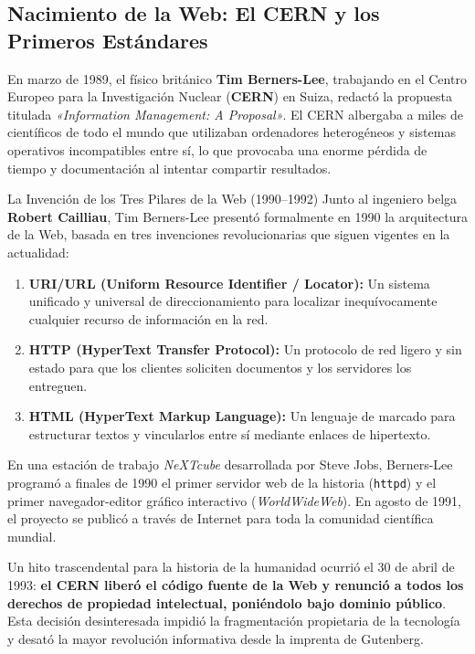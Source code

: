 \subsection{Nacimiento de la Web: El CERN y los Primeros Estándares}

En marzo de 1989, el físico británico \textbf{Tim Berners-Lee}, trabajando en el Centro Europeo para la Investigación Nuclear (\textbf{CERN}) en Suiza, redactó la propuesta titulada \textit{«Information Management: A Proposal»}. El CERN albergaba a miles de científicos de todo el mundo que utilizaban ordenadores heterogéneos y sistemas operativos incompatibles entre sí, lo que provocaba una enorme pérdida de tiempo y documentación al intentar compartir resultados.

\begin{historia}{La Invención de los Tres Pilares de la Web (1990--1992)}
Junto al ingeniero belga \textbf{Robert Cailliau}, Tim Berners-Lee presentó formalmente en 1990 la arquitectura de la Web, basada en tres invenciones revolucionarias que siguen vigentes en la actualidad:
\begin{enumerate}
  \item \textbf{URI/URL (Uniform Resource Identifier / Locator):} Un sistema unificado y universal de direccionamiento para localizar inequívocamente cualquier recurso de información en la red.
  \item \textbf{HTTP (HyperText Transfer Protocol):} Un protocolo de red ligero y sin estado para que los clientes soliciten documentos y los servidores los entreguen.
  \item \textbf{HTML (HyperText Markup Language):} Un lenguaje de marcado para estructurar textos y vincularlos entre sí mediante enlaces de hipertexto.
\end{enumerate}
En una estación de trabajo \textit{NeXTcube} desarrollada por Steve Jobs, Berners-Lee programó a finales de 1990 el primer servidor web de la historia (\texttt{httpd}) y el primer navegador-editor gráfico interactivo (\textit{WorldWideWeb}). En agosto de 1991, el proyecto se publicó a través de Internet para toda la comunidad científica mundial.
\end{historia}

Un hito trascendental para la historia de la humanidad ocurrió el 30 de abril de 1993: \textbf{el CERN liberó el código fuente de la Web y renunció a todos los derechos de propiedad intelectual, poniéndolo bajo dominio público}. Esta decisión desinteresada impidió la fragmentación propietaria de la tecnología y desató la mayor revolución informativa desde la imprenta de Gutenberg.

